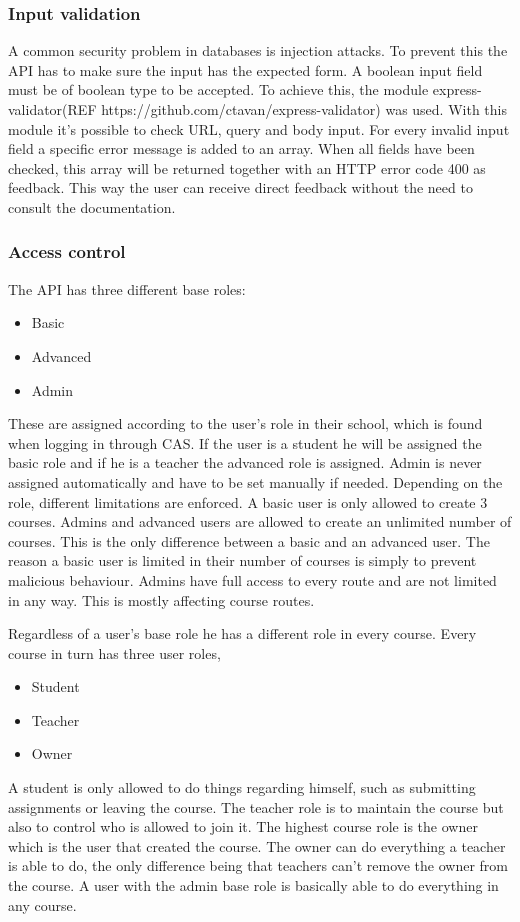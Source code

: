 \subsubsection{Input validation}
A common security problem in databases is injection attacks. To prevent this the API has to make sure the input has the expected form. A boolean input field must be of boolean type to be accepted. To achieve this, the module express-validator(REF https://github.com/ctavan/express-validator) was used. With this module it's possible to check URL, query and body input. For every invalid input field a specific error message is added to an array. When all fields have been checked, this array will be returned together with an HTTP error code 400 as feedback. This way the user can receive direct feedback without the need to consult the documentation.

\subsubsection{Access control}
The API has three different base roles:
\begin{itemize}
\item Basic
\item Advanced
\item Admin
\end{itemize}
These are assigned according to the user's role in their school, which is found when logging in through CAS. If the user is a student he will be assigned the basic role and if he is a teacher the advanced role is assigned. Admin is never assigned automatically and have to be set manually if needed. Depending on the role, different limitations are enforced. A basic user is only allowed to create 3 courses. Admins and advanced users are allowed to create an unlimited number of courses. This is the only difference between a basic and an advanced user. The reason a basic user is limited in their number of courses is simply to prevent malicious behaviour. Admins have full access to every route and are not limited in any way. This is mostly affecting course routes.

Regardless of a user's base role he has a different role in every course. Every course in turn has three user roles,
\begin{itemize}
\item Student
\item Teacher
\item Owner
\end{itemize}
A student is only allowed to do things regarding himself, such as submitting assignments or leaving the course. The teacher role is to maintain the course but also to control who is allowed to join it. The highest course role is the owner which is the user that created the course. The owner can do everything a teacher is able to do, the only difference being that teachers can't remove the owner from the course. A user with the admin base role is basically able to do everything in any course.

